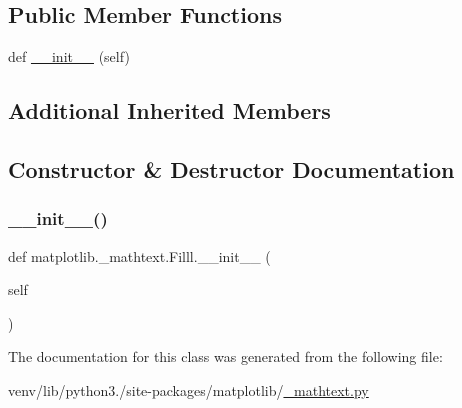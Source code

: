 \subsection*{Public Member Functions}
\begin{DoxyCompactItemize}
\item 
def \hyperlink{classmatplotlib_1_1__mathtext_1_1Filll_adac6241b6b1449c4ca415e03de0e8a57}{\+\_\+\+\_\+init\+\_\+\+\_\+} (self)
\end{DoxyCompactItemize}
\subsection*{Additional Inherited Members}


\subsection{Constructor \& Destructor Documentation}
\mbox{\label{classmatplotlib_1_1__mathtext_1_1Filll_adac6241b6b1449c4ca415e03de0e8a57}} 
\subsubsection{\texorpdfstring{\+\_\+\+\_\+init\+\_\+\+\_\+()}{\_\_init\_\_()}}
{\footnotesize\ttfamily def matplotlib.\+\_\+mathtext.\+Filll.\+\_\+\+\_\+init\+\_\+\+\_\+ (\begin{DoxyParamCaption}\item[{}]{self }\end{DoxyParamCaption})}



The documentation for this class was generated from the following file\+:\begin{DoxyCompactItemize}
\item 
venv/lib/python3./site-\/packages/matplotlib/\hyperlink{__mathtext_8py}{\+\_\+mathtext.\+py}\end{DoxyCompactItemize}
